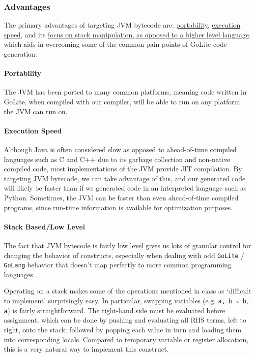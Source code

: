 \documentclass[11pt]{article}
\begin{document}
\subsubsection{Advantages}
The primary advantages of targeting JVM bytecode are:
\hyperref[sec:portability]{portability},
\hyperref[sec:execs]{execution speed}, and its
\hyperref[sec:stack]{focus on stack manipulation, as opposed to a
  higher level language}, which aids in overcoming some of the common
pain points of GoLite code generation:
\paragraph{Portability}%
\label{sec:portability}
The JVM has been ported to many common platforms, meaning code written
in GoLite, when compiled with our compiler, will be able to run on any
platform the JVM can run on.
\paragraph{Execution Speed}%
\label{sec:execs}
Although Java is often considered slow as opposed to ahead-of-time
compiled languages such as C and C++ due to its garbage collection and
non-native compiled code, most implementations of the JVM provide JIT
compilation.  By targeting JVM bytecode, we can take advantage of
this, and our generated code will likely be faster than if we
generated code in an interpreted language such as Python. Sometimes,
the JVM can be faster than even ahead-of-time compiled programs, since
run-time information is available for optimization purposes.
\paragraph{Stack Based/Low Level}%
\label{sec:stack}
The fact that JVM bytecode is fairly low level gives us lots of
granular control for changing the behavior of constructs, especially
when dealing with odd \texttt{GoLite} / \texttt{GoLang} behavior that
doesn't map perfectly to more common programming languages.

Operating on a stack makes some of the operations mentioned in class
as `difficult to implement' surprisingly easy. In particular, swapping
variables (e.g. \texttt{a, b = b, a}) is fairly straightforward. The
right-hand side must be evaluated before assignment, which can be done
by pushing and evaluating all RHS terms, left to right, onto the
stack; followed by popping each value in turn and loading them into
corresponding locals. Compared to temporary variable or register
allocation, this is a very natural way to implement this construct.
\end{document}
